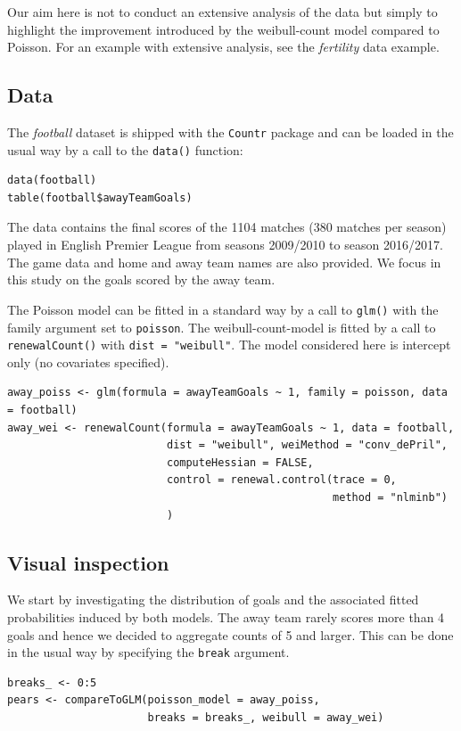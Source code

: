 \documentclass[a4paper,twoside,11pt]{article}
\begin{document}
Our aim here is not to conduct an extensive analysis of the data but simply to
highlight the improvement introduced by the weibull-count model compared to
Poisson. For an example with extensive analysis, see the \emph{fertility} data
example.


\subsection{Data}
\label{sec:org59ef048}

The \emph{football} dataset is shipped with the \texttt{Countr} package and can be loaded
in the usual way by a call to the \texttt{data()} function:
\begin{verbatim}
data(football)
table(football$awayTeamGoals)
\end{verbatim}

The data contains the final scores of the 1104 matches (380 matches per season)
played in English Premier League from seasons 2009/2010 to season 2016/2017. The
game data and home and away team names are also provided. We focus in this study
on the goals scored by the away team.

The Poisson model can be fitted in a standard way by a call to \texttt{glm()} with the
family argument set to \texttt{poisson}. The weibull-count-model is fitted by a call to
\texttt{renewalCount()} with \texttt{dist = "weibull"}. The model considered here is intercept
only (no covariates specified).
\begin{verbatim}
away_poiss <- glm(formula = awayTeamGoals ~ 1, family = poisson, data = football)
away_wei <- renewalCount(formula = awayTeamGoals ~ 1, data = football,
                         dist = "weibull", weiMethod = "conv_dePril",
                         computeHessian = FALSE, 
                         control = renewal.control(trace = 0,
                                                   method = "nlminb")
                         )
\end{verbatim}



\subsection{Visual inspection}
\label{sec:orgbed4489}

We start by investigating the distribution of goals and the associated fitted
probabilities induced by both models. The away team rarely scores more than 4
goals and hence we decided to aggregate counts of 5 and larger. This can be done
in the usual way by specifying the \texttt{break} argument.
\begin{verbatim}
breaks_ <- 0:5
pears <- compareToGLM(poisson_model = away_poiss,
                      breaks = breaks_, weibull = away_wei)
\end{verbatim}
\end{document}
